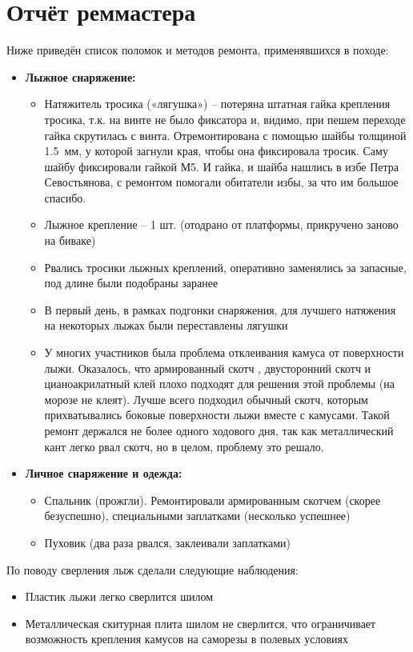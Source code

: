 \section{Отчёт реммастера}

Ниже приведён список поломок и методов ремонта, применявшихся в походе:

\begin{itemize}
	\item \textbf{Лыжное снаряжение:}
	\begin{itemize}
		\item Натяжитель тросика («лягушка») – потеряна штатная гайка крепления тросика, т.к. на винте не было фиксатора и, видимо, при пешем переходе гайка скрутилась с винта. Отремонтирована с помощью шайбы толщиной 1.5~мм, у которой загнули края, чтобы она фиксировала тросик. Саму шайбу фиксировали гайкой М5. И гайка, и шайба нашлись в избе Петра Севостьянова, с ремонтом помогали обитатели избы, за что им большое спасибо.
		\item Лыжное крепление – 1 шт. (отодрано от платформы, прикручено заново на биваке)
		\item Рвались тросики лыжных креплений, оперативно заменялись за запасные, под длине были подобраны заранее
		\item В первый день, в рамках подгонки снаряжения, для лучшего натяжения на некоторых лыжах были переставлены лягушки
		\item У многих участников была проблема отклеивания камуса от поверхности лыжи. Оказалось, что армированный скотч , двусторонний скотч и цианоакрилатный клей плохо подходят для решения этой проблемы (на морозе не клеят). Лучше всего подходил обычный скотч, которым прихватывались боковые поверхности лыжи вместе с камусами. Такой ремонт держался не более одного ходового дня, так как металлический кант легко рвал скотч, но в целом, проблему это решало.
	\end{itemize}
	
	\item \textbf{Личное снаряжение и одежда:}
	\begin{itemize}
		\item Спальник (прожгли). Ремонтировали армированным скотчем (скорее безуспешно), специальными заплатками (несколько успешнее)
		\item Пуховик (два раза рвался, заклеивали заплатками)
	\end{itemize}
\end{itemize}

По поводу сверления лыж сделали следующие наблюдения:

\begin{itemize}

		\item Пластик лыжи легко сверлится шилом
		\item Металлическая скитурная плита шилом не сверлится, что ограничивает возможность крепления камусов на саморезы в полевых условиях

\end{itemize}




\clearpage
